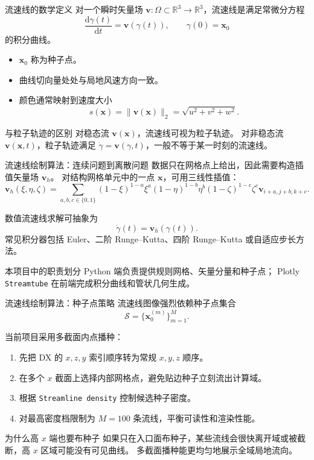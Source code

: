 \documentclass[aspectratio=169,11pt]{ctexbeamer}
\newcommand{\R}{\mathbb R}
\newcommand{\vx}{\mathbf x}
\newcommand{\vv}{\mathbf v}
\newcommand{\dd}{\mathrm d}
\begin{document}
\begin{frame}{流速线的数学定义}
  \small
  对一个瞬时矢量场 $\vv:\Omega\subset\R^3\to\R^3$，流速线是满足常微分方程
  \[
    \frac{\dd\gamma(t)}{\dd t}=\vv(\gamma(t)),\qquad
    \gamma(0)=\vx_0
  \]
  的积分曲线。

  \begin{itemize}
    \item $\vx_0$ 称为种子点。
    \item 曲线切向量处处与局地风速方向一致。
    \item 颜色通常映射到速度大小
      \[
        s(\vx)=\|\vv(\vx)\|_2=\sqrt{u^2+v^2+w^2}.
      \]
  \end{itemize}

  \begin{block}{与粒子轨迹的区别}
    对稳态流 $\vv(\vx)$，流速线可视为粒子轨迹。
    对非稳态流 $\vv(\vx,t)$，粒子轨迹满足 $\dot\gamma=\vv(\gamma,t)$，一般不等于某一时刻的流速线。
  \end{block}
\end{frame}

\begin{frame}{流速线绘制算法：连续问题到离散问题}
  \small
  数据只在网格点上给出，因此需要构造插值矢量场 $\vv_h$。
  对结构网格单元中的一点 $\vx$，可用三线性插值：
  \[
    \vv_h(\xi,\eta,\zeta)=
    \sum_{a,b,c\in\{0,1\}}
    (1-\xi)^{1-a}\xi^a
    (1-\eta)^{1-b}\eta^b
    (1-\zeta)^{1-c}\zeta^c
    \vv_{i+a,j+b,k+c}.
  \]

  数值流速线求解可抽象为
  \[
    \dot \gamma(t)=\vv_h(\gamma(t)).
  \]
  常见积分器包括 Euler、二阶 Runge--Kutta、四阶 Runge--Kutta 或自适应步长方法。

  \begin{block}{本项目中的职责划分}
    Python 端负责提供规则网格、矢量分量和种子点；
    Plotly \texttt{Streamtube} 在前端完成积分曲线和管状几何生成。
  \end{block}
\end{frame}

\begin{frame}{流速线绘制算法：种子点策略}
  \small
  流速线图像强烈依赖种子点集合
  \[
    \mathcal S=\{\vx_0^{(m)}\}_{m=1}^M .
  \]

  当前项目采用多截面内点播种：
  \begin{enumerate}
    \item 先把 DX 的 $x,z,y$ 索引顺序转为常规 $x,y,z$ 顺序。
    \item 在多个 $x$ 截面上选择内部网格点，避免贴边种子立刻流出计算域。
    \item 根据 \texttt{Streamline density} 控制候选种子密度。
    \item 对最高密度档限制为 $M=100$ 条流线，平衡可读性和渲染性能。
  \end{enumerate}

  \begin{block}{为什么高 $x$ 端也要布种子}
    如果只在入口面布种子，某些流线会很快离开域或被截断，高 $x$ 区域可能没有可见曲线。
    多截面播种能更均匀地展示全域局地流向。
  \end{block}
\end{frame}
\end{document}

